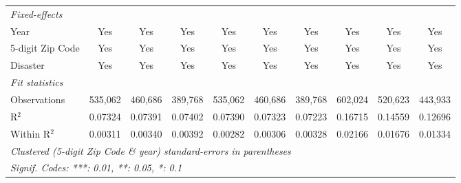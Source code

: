 \begin{tabular}{lccccccccc}
   \midrule
   \emph{Fixed-effects}\\
   Year                                                       & Yes            & Yes            & Yes            & Yes            & Yes            & Yes           & Yes            & Yes           & Yes\\  
   5-digit Zip Code                                           & Yes            & Yes            & Yes            & Yes            & Yes            & Yes           & Yes            & Yes           & Yes\\  
   Disaster                                                   & Yes            & Yes            & Yes            & Yes            & Yes            & Yes           & Yes            & Yes           & Yes\\  
   \midrule
   \emph{Fit statistics}\\
   Observations                                               & 535,062        & 460,686        & 389,768        & 535,062        & 460,686        & 389,768       & 602,024        & 520,623       & 443,933\\  
   R$^2$                                                      & 0.07324        & 0.07391        & 0.07402        & 0.07390        & 0.07323        & 0.07223       & 0.16715        & 0.14559       & 0.12696\\  
   Within R$^2$                                               & 0.00311        & 0.00340        & 0.00392        & 0.00282        & 0.00306        & 0.00328       & 0.02166        & 0.01676       & 0.01334\\  
   \midrule \midrule
   \multicolumn{10}{l}{\emph{Clustered (5-digit Zip Code \& year) standard-errors in parentheses}}\\
   \multicolumn{10}{l}{\emph{Signif. Codes: ***: 0.01, **: 0.05, *: 0.1}}\\
\end{tabular}
\par\endgroup
